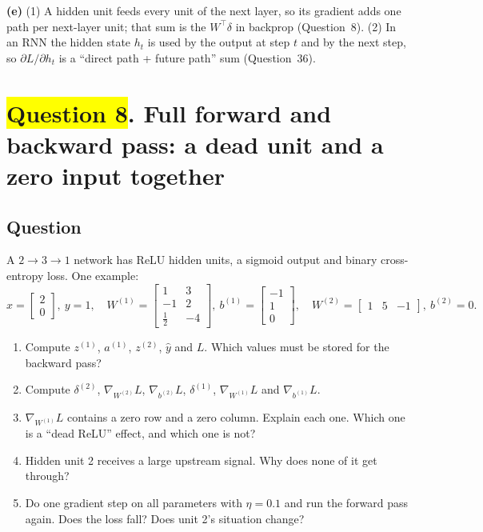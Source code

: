 \documentclass[12pt,a4paper]{article}
\newcommand{\hlq}[1]{{\setlength{\fboxsep}{1.5pt}\colorbox{yellow}{#1}}}
\begin{document}
\textbf{(e)} (1) A hidden unit feeds every unit of the next layer, so its gradient adds one path per next-layer unit; that sum is the $W^\top\delta$ in backprop (Question~8). (2) In an RNN the hidden state $h_t$ is used by the output at step $t$ and by the next step, so $\partial L/\partial h_t$ is a ``direct path + future path'' sum (Question~36).
\section[Question 8. Full forward and backward pass: a dead unit and a zero input together]{\hlq{Question 8}. Full forward and backward pass: a dead unit and a zero input together}
\subsection*{Question}
A $2\to3\to1$ network has ReLU hidden units, a sigmoid output and binary cross-entropy loss. One example:
\[
x=\begin{bmatrix}2\\0\end{bmatrix},\ y=1,\quad
W^{(1)}=\begin{bmatrix}1&3\\-1&2\\ \tfrac12&-4\end{bmatrix},\ b^{(1)}=\begin{bmatrix}-1\\1\\0\end{bmatrix},\quad
W^{(2)}=\begin{bmatrix}1&5&-1\end{bmatrix},\ b^{(2)}=0 .
\]
\begin{enumerate}[label=(\alph*)]
\item Compute $z^{(1)}$, $a^{(1)}$, $z^{(2)}$, $\hat y$ and $L$. Which values must be stored for the backward pass?
\item Compute $\delta^{(2)}$, $\nabla_{W^{(2)}}L$, $\nabla_{b^{(2)}}L$, $\delta^{(1)}$, $\nabla_{W^{(1)}}L$ and $\nabla_{b^{(1)}}L$.
\item $\nabla_{W^{(1)}}L$ contains a zero row and a zero column. Explain each one. Which one is a ``dead ReLU'' effect, and which one is not?
\item Hidden unit 2 receives a large upstream signal. Why does none of it get through?
\item Do one gradient step on all parameters with $\eta=0.1$ and run the forward pass again. Does the loss fall? Does unit 2's situation change?
\end{enumerate}
\end{document}
